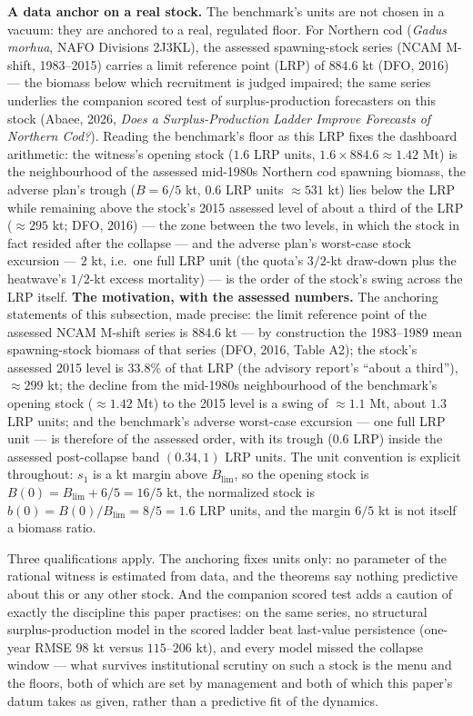 \documentclass[3p,11pt]{elsarticle}
\begin{document}
\textbf{A data anchor on a real stock.} The benchmark's units are not chosen in a
vacuum: they are anchored to a real, regulated floor. For Northern cod
(\emph{Gadus morhua}, NAFO Divisions 2J3KL), the assessed spawning-stock
series (NCAM M-shift, 1983--2015) carries a limit reference point (LRP) of
\(884.6\) kt (DFO, 2016) --- the biomass below which recruitment is judged
impaired; the same series underlies the companion scored test of
surplus-production forecasters on this stock (Abaee, 2026, \emph{Does a
Surplus-Production Ladder Improve Forecasts of Northern Cod?}). Reading the
benchmark's floor as this LRP fixes the dashboard arithmetic: the witness's
opening stock (\(1.6\) LRP units, \(1.6 \times 884.6 \approx 1.42\) Mt) is the
neighbourhood of the assessed mid-1980s Northern cod spawning biomass, the
adverse plan's trough (\(B = 6/5\) kt, \(0.6\) LRP units \(\approx 531\)
kt) lies below the LRP while remaining above the stock's 2015
assessed level of about a third of the LRP (\(\approx 295\) kt; DFO,
2016) --- the zone between the two levels, in which the stock in fact
resided after the collapse --- and the adverse plan's
worst-case stock excursion --- \(2\) kt, i.e.\ one full LRP unit (the
quota's \(3/2\)-kt draw-down plus the heatwave's \(1/2\)-kt excess
mortality) --- is the order of the stock's swing across the LRP itself.
\textbf{The motivation, with the assessed numbers.} The anchoring
statements of this subsection, made precise: the limit reference point of
the assessed NCAM M-shift series is \(884.6\) kt --- by construction the
1983--1989 mean spawning-stock biomass of that series (DFO, 2016, Table
A2); the stock's assessed 2015 level is \(33.8\%\) of that LRP (the
advisory report's ``about a third''), \(\approx 299\) kt; the decline
from the mid-1980s neighbourhood of the benchmark's opening stock
(\(\approx 1.42\) Mt) to the 2015 level is a swing of \(\approx 1.1\)
Mt, about \(1.3\) LRP units; and the benchmark's adverse worst-case
excursion --- one full LRP unit --- is therefore of the assessed order,
with its trough (\(0.6\) LRP) inside the assessed post-collapse band
\((0.34, 1)\) LRP units. The unit convention is explicit throughout:
\(s_1\) is a kt margin above \(B_{\mathrm{lim}}\), so the opening
stock is \(B(0) = B_{\mathrm{lim}} + 6/5 = 16/5\) kt, the normalized
stock is \(b(0) = B(0)/B_{\mathrm{lim}} = 8/5 = 1.6\) LRP units, and the
margin \(6/5\) kt is not itself a biomass ratio.

Three qualifications apply. The anchoring fixes units only: no
parameter of the rational witness is estimated from data, and the
theorems say nothing predictive about this or any other stock. And the companion scored test adds a caution of exactly the
discipline this paper practises: on the same series, no structural
surplus-production model in the scored ladder beat last-value persistence
(one-year RMSE \(98\) kt versus \(115\)--\(206\) kt), and every model missed
the collapse window --- what survives institutional scrutiny on such a stock
is the menu and the floors, both of which are set by management and both of
which this paper's datum takes as given, rather than a predictive fit of the
dynamics.
\end{document}
